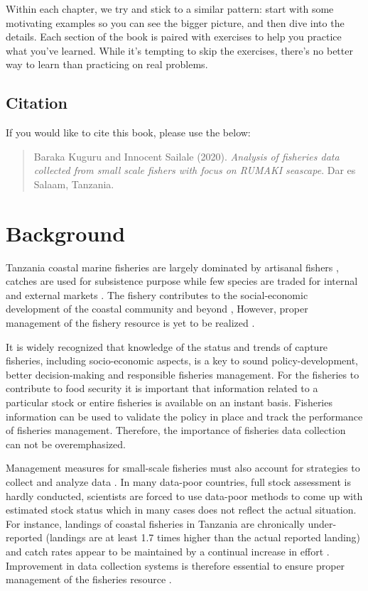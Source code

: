 \documentclass[
  12pt,
  a4paper,
  oneside]{book}
\begin{document}
Within each chapter, we try and stick to a similar pattern: start with some motivating examples so you can see the bigger picture, and then dive into the details. Each section of the book is paired with exercises to help you practice what you've learned. While it's tempting to skip the exercises, there's no better way to learn than practicing on real problems.

\hypertarget{citation}{%
\section*{Citation}\label{citation}}

If you would like to cite this book, please use the below:

\begin{quote}
Baraka Kuguru and Innocent Sailale (2020). \emph{Analysis of fisheries data collected from small scale fishers with focus on RUMAKI seascape}. Dar es Salaam, Tanzania.
\end{quote}

\hypertarget{intro}{%
\chapter{Background}\label{intro}}

Tanzania coastal marine fisheries are largely dominated by artisanal fishers \citep{sobo04}, catches are used for subsistence purpose while few species are traded for internal and external markets \citep{pandu}. The fishery contributes to the social-economic development of the coastal community  and beyond \citep{pandu}, However, proper management  of the fishery resource is yet to be realized \citep{berachi, pandu, jacquet}.

It is widely recognized that knowledge of the status and trends of capture fisheries, including socio-economic aspects, is a key to sound policy-development, better decision-making and responsible fisheries management. For the fisheries to contribute to food security it is important that information related to a particular stock or entire fisheries is available on an instant basis. Fisheries information can be used to validate the policy in place and track the performance of fisheries management. Therefore, the importance of fisheries data collection can not be overemphasized.

Management measures for small-scale fisheries must also account for strategies to collect and analyze data \citep{robertson}. In many data-poor countries, full stock assessment  is hardly conducted, scientists are forced to use data-poor methods to come up with estimated stock  status which in many cases does not reflect the actual situation. For instance, landings of coastal fisheries in Tanzania are chronically under-reported (landings are at least 1.7 times higher than the actual reported landing) and catch rates appear to be maintained by a continual increase in effort \citep{jacquet, bush}. Improvement in data collection systems is therefore essential to ensure proper management of the fisheries resource .
\end{document}
